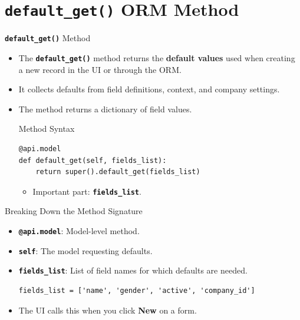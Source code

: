 
\section{\textbf{\texttt{default\_get()}} ORM Method}

\begin{frame}[fragile]{\textbf{\texttt{default\_get()}} Method}
	\begin{itemize}
		\item The \textbf{\texttt{default\_get()}} method returns the \textbf{default values} used when creating a new record in the UI or through the ORM.
		\item It collects defaults from field definitions, context, and company settings.
		\item The method returns a dictionary of field values.
\begin{block}{Method Syntax}
\begin{lstlisting}
@api.model
def default_get(self, fields_list):
	return super().default_get(fields_list)
\end{lstlisting}
	\begin{itemize}
		\item Important part: \textbf{\texttt{fields\_list}}.
	\end{itemize}
\end{block}
	\end{itemize}
\end{frame}

\begin{frame}[fragile]{Breaking Down the Method Signature}
	\begin{block}{}
		\begin{itemize}
			\item \textbf{\texttt{@api.model}}: Model-level method.
			\item \textbf{\texttt{self}}: The model requesting defaults.
			\item \textbf{\texttt{fields\_list}}: List of field names for which defaults are needed.
\begin{lstlisting}
fields_list = ['name', 'gender', 'active', 'company_id']
\end{lstlisting}
			\item The UI calls this when you click \textbf{New} on a form.
		\end{itemize}
	\end{block}
\end{frame}


